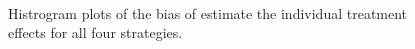 \begin{figure}[ht!]
\begin{center}
{{			}
		}\\ 	
	\end{center}
	\caption{Histrogram plots of the bias of estimate the individual treatment effects for all four strategies.}
	\label{fig4_2}
\end{figure}


